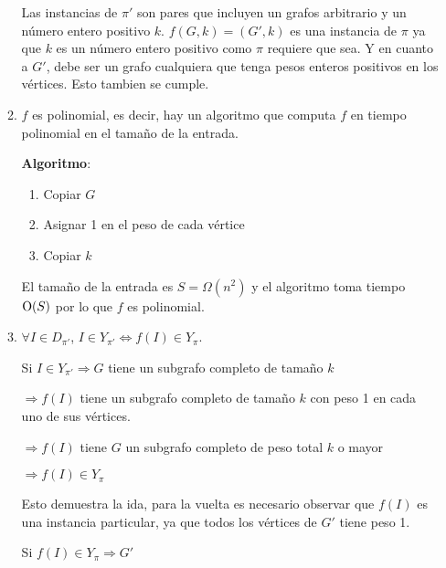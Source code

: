 \begin{enumerate}
\begin{enumerate}
Las instancias de $\pi'$ son pares que incluyen un grafos arbitrario y un
número entero positivo $k$. $f(G, k) = (G', k)$ es una instancia de $\pi$ ya
que $k$ es un número entero positivo como $\pi$ requiere que sea. Y en cuanto
a $G'$, debe ser un grafo cualquiera que tenga pesos enteros positivos en los
vértices. Esto tambien se cumple.

\item
$f$ es polinomial, es decir, hay un algoritmo que computa $f$ en tiempo
polinomial en el tamaño de la entrada.

\textbf{Algoritmo}:

\begin{enumerate}
\item Copiar $G$
\item Asignar 1 en el peso de cada vértice
\item Copiar $k$
\end{enumerate}

El tamaño de la entrada es $S = \Omega(n^2)$ y el algoritmo toma tiempo
$\operatorname{O}(S)$ por lo que $f$ es polinomial.

\item
$\forall I \in D_{\pi'}$, $I \in Y_{\pi'} \Longleftrightarrow f(I) \in Y_\pi$.

Si $I \in Y_{\pi'} \Longrightarrow G$ tiene un subgrafo completo de tamaño $k$

$\Longrightarrow f(I)$ tiene un subgrafo completo de tamaño $k$ con peso 1 en
cada uno de sus vértices.

$\Longrightarrow f(I)$ tiene $G$ un subgrafo completo de peso total $k$ o
mayor

$\Longrightarrow f(I) \in Y_\pi$

Esto demuestra la ida, para la vuelta es necesario observar que $f(I)$ es
una instancia particular, ya que todos los vértices de $G'$ tiene peso 1.

Si $f(I) \in Y_\pi \Longrightarrow G'$

\end{enumerate}
\end{enumerate}